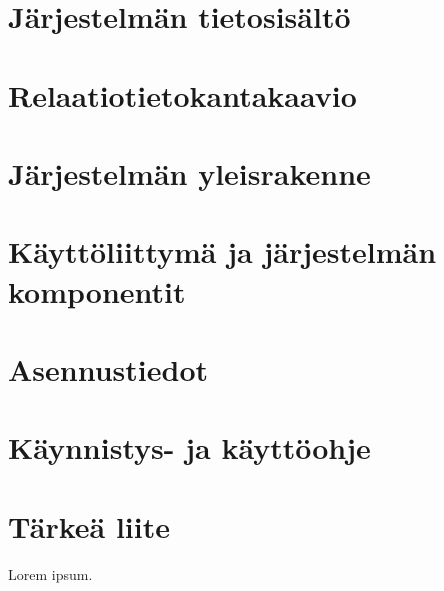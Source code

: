 \documentclass[12pt,a4paper,titlepage]{article}
\begin{document}
\section{Järjestelmän tietosisältö}

\section{Relaatiotietokantakaavio}

\section{Järjestelmän yleisrakenne}

\section{Käyttöliittymä ja järjestelmän komponentit}

\section{Asennustiedot}

\section{Käynnistys- ja käyttöohje}




\small


\appendix
\section{Tärkeä liite}
Lorem ipsum.
\newpage
\end{document}
